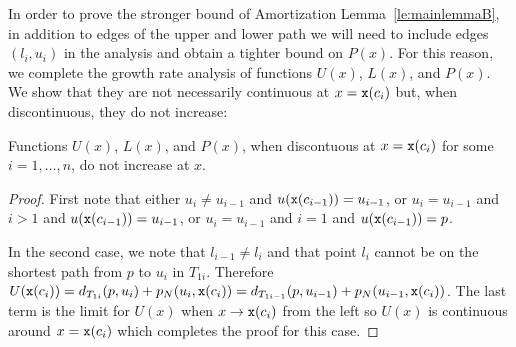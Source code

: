 In order to prove the stronger bound of Amortization Lemma~\ref{le:mainlemmaB},
in addition to edges of the upper and lower path we will need to include edges
$(l_i,u_i)$ in the analysis and obtain a tighter bound on $P(x)$.
For this reason, we complete the growth rate analysis of
functions $U(x)$, $L(x)$, and $P(x)$. We show that they are not necessarily 
continuous at $x = {\tt x}(c_i)$ but, when discontinuous, they do not increase:
\begin{lemma} 
\label{lem:discontinuity}
Functions $U(x)$, $L(x)$, and $P(x)$, when discontuous at $x={\tt x}(c_i)$
for some $i = 1, \dots, n$, do not increase at $x$. 
\end{lemma}
\begin{proof}
First note that either 
$u_i \not= u_{i-1}$ and $u({\tt x}(c_{i-1})) = u_{i-1}$, or
$u_i = u_{i-1}$ and $i > 1$ and $u({\tt x}(c_{i-1})) = u_{i-1}$, or 
$u_i = u_{i-1}$ and $i = 1$ and $u({\tt x}(c_{i-1})) = p$.  

In the second case, we note that $l_{i-1} \not= l_i$ and that point $l_i$
cannot be on the shortest path from $p$ to $u_i$ in $T_{1i}$. Therefore 
$U({\tt x}(c_i))=d_{T_{1i}}(p,u_i) + p_N(u_i, {\tt x}(c_i)) = d_{T_{1{i-1}}}(p,u_{i-1}) + p_N(u_{i-1}, {\tt x}(c_i))$. The last term is the limit for $U(x)$ when $x \rightarrow {\tt x}(c_i)$ from
the left so $U(x)$ is continuous around $x = {\tt x}(c_i)$ which completes the 
proof for this case.


\end{proof}
